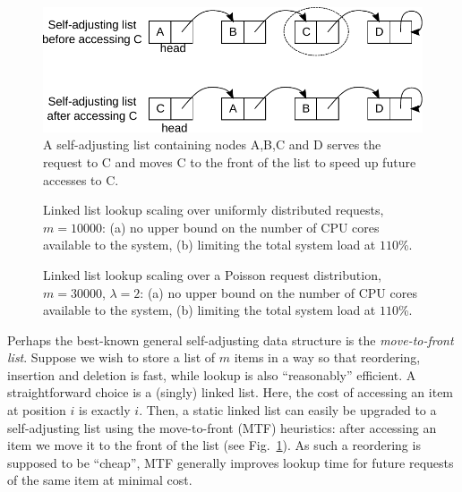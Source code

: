 \documentclass[letterpaper,twocolumn,10pt]{article}
\begin{document}
\begin{figure}[t]
  \centering
  \includegraphics[width=.85\linewidth]{fig/mtf.pdf}
  \caption{A self-adjusting list containing nodes A,B,C and D serves the request to C and moves C to the front of the list to speed up future accesses to C.}
  \label{fig:mtf-example}
\end{figure}

\begin{figure}[t]
    \centering
    \subfloat[][multicore]{\label{fig:multicore-list-uniform-10}}
    \hfill%
    \subfloat[][singlecore]{\label{fig:singlecore-list-uniform-10}}
    \caption{Linked list lookup scaling over uniformly distributed requests, $m=10000$: (a) no upper bound on the number of CPU cores available to the system, (b) limiting the total system load at $110$\%.}
  \label{fig:multicore-list}
\end{figure}

\begin{figure}[t]
  \centering
  \subfloat[][multicore]{\label{fig:multicore-list-poisson-300}}
    \hfill%
  \subfloat[][singlecore]{\label{fig:singlecore-list-poisson-300}}
  \caption{Linked list lookup scaling over a Poisson request distribution, $m=30000$, $\lambda=2$: (a) no upper bound on the number of CPU cores available to the system, (b) limiting the total system load at $110$\%.}
  \label{fig:multicore-list-poisson}
\end{figure}

Perhaps the best-known general self-adjusting data structure is the \emph{move-to-front list}. Suppose we wish to store a list of $m$ items in a way so that reordering, insertion and deletion is fast, while lookup is also ``reasonably'' efficient. A straightforward choice is a (singly) linked list. Here, the cost of accessing an item at position $i$ is exactly $i$. Then, a static linked list can easily be upgraded to a self-adjusting list using the move-to-front (MTF) heuristics: after accessing an item we move it to the front of the list (see Fig.~\ref{fig:mtf-example}). As such a reordering is supposed to be ``cheap'', MTF generally improves lookup time for future requests of the same item at minimal cost.
\end{document}
